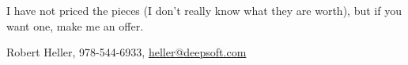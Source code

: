 \documentclass[12pt]{article}
\begin{document}
I have not priced the pieces (I don't really know what they are worth), but if 
you want one, make me an offer.

Robert Heller, 978-544-6933, \url{heller@deepsoft.com}









%

\end{document}

